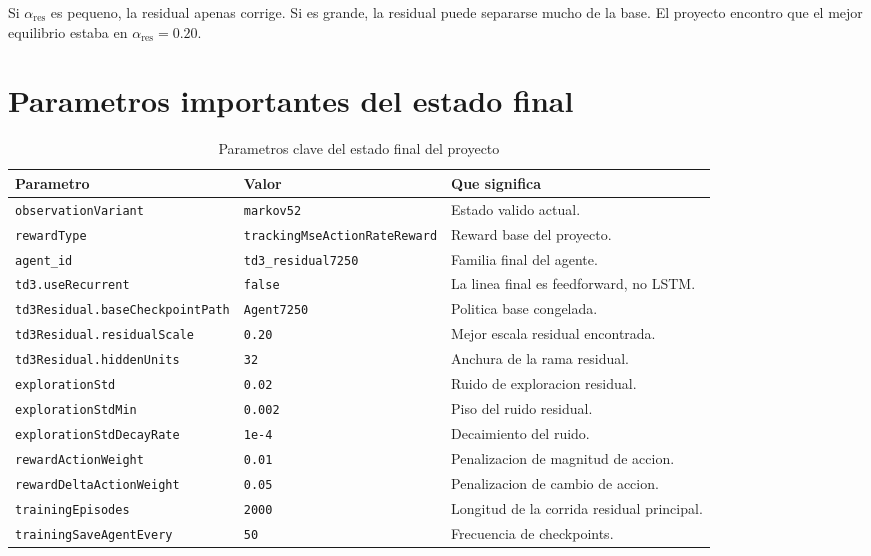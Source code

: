 \documentclass[11pt,a4paper]{article}
\begin{document}
Si \(\alpha_{\mathrm{res}}\) es pequeno, la residual apenas corrige. Si es grande, la residual puede separarse mucho de la base. El proyecto encontro que el mejor equilibrio estaba en \(\alpha_{\mathrm{res}} = 0.20\).

\section{Parametros importantes del estado final}

\begin{table}[H]
\centering
\caption{Parametros clave del estado final del proyecto}
\begin{tabularx}{\linewidth}{L{5.0cm}L{2.7cm}Y}
\toprule
Parametro & Valor & Que significa \\
\midrule
\texttt{observationVariant} & \texttt{markov52} & Estado valido actual. \\
\texttt{rewardType} & \texttt{trackingMseActionRateReward} & Reward base del proyecto. \\
\texttt{agent\_id} & \texttt{td3\_residual7250} & Familia final del agente. \\
\texttt{td3.useRecurrent} & \texttt{false} & La linea final es feedforward, no LSTM. \\
\texttt{td3Residual.baseCheckpointPath} & \texttt{Agent7250} & Politica base congelada. \\
\texttt{td3Residual.residualScale} & \texttt{0.20} & Mejor escala residual encontrada. \\
\texttt{td3Residual.hiddenUnits} & \texttt{32} & Anchura de la rama residual. \\
\texttt{explorationStd} & \texttt{0.02} & Ruido de exploracion residual. \\
\texttt{explorationStdMin} & \texttt{0.002} & Piso del ruido residual. \\
\texttt{explorationStdDecayRate} & \texttt{1e-4} & Decaimiento del ruido. \\
\texttt{rewardActionWeight} & \texttt{0.01} & Penalizacion de magnitud de accion. \\
\texttt{rewardDeltaActionWeight} & \texttt{0.05} & Penalizacion de cambio de accion. \\
\texttt{trainingEpisodes} & \texttt{2000} & Longitud de la corrida residual principal. \\
\texttt{trainingSaveAgentEvery} & \texttt{50} & Frecuencia de checkpoints. \\
\bottomrule
\end{tabularx}
\end{table}
\end{document}

